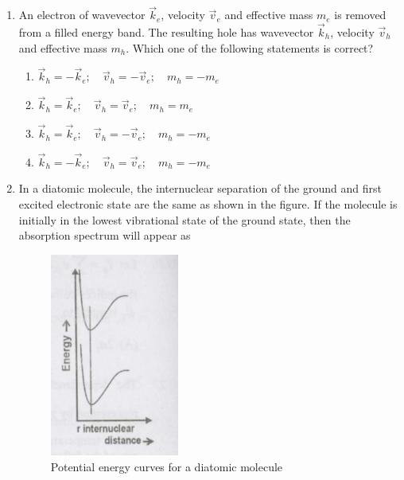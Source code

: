 \documentclass[14pt, a4paper]{extarticle}
\begin{document}
\begin{enumerate}[label=\textbf{Q. \arabic*}, start=21]
\item An electron of wavevector $\vec{k}_e$, velocity $\vec{v}_e$ and effective mass $m_e$ is removed from a filled energy band. The resulting hole has wavevector $\vec{k}_h$, velocity $\vec{v}_h$ and effective mass $m_h$. Which one of the following statements is correct?
\begin{enumerate}[label=(\Alph*)]
\item $\vec{k}_h = -\vec{k}_e; \quad \vec{v}_h = -\vec{v}_e; \quad m_h = -m_e$
\item $\vec{k}_h = \vec{k}_e; \quad \vec{v}_h = \vec{v}_e; \quad m_h = m_e$
\item $\vec{k}_h = \vec{k}_e; \quad \vec{v}_h = -\vec{v}_e; \quad m_h = -m_e$
\item $\vec{k}_h = -\vec{k}_e; \quad \vec{v}_h = \vec{v}_e; \quad m_h = -m_e$
\end{enumerate}

\vspace{24em}

\item In a diatomic molecule, the internuclear separation of the ground and first excited electronic state are the same as shown in the figure.
If the molecule is initially in the lowest vibrational state of the ground state, then the absorption spectrum will appear as
\begin{figure}[H]
\centering
\includegraphics[width=0.4\textwidth]{figs/Q30fig1.png}
\caption{Potential energy curves for a diatomic molecule}
\label{fig:q30_main}
\end{figure}
\begin{enumerate}[label=(\Alph*)]
\end{enumerate}
\end{enumerate}
\end{document}
